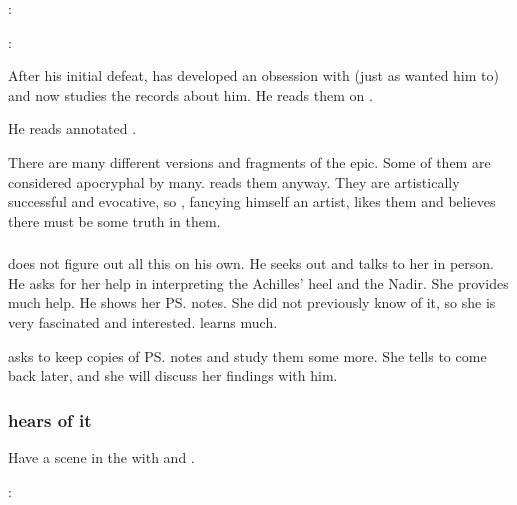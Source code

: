 \begin{garbage}
\begin{prose}
  \Menessiaraid:
  
  \Teshrial: 
\end{prose}

After his initial defeat, \Teshrial{} has developed an obsession with \Ishnaruchaefir{} (just as \Ishnaruchaefir{} wanted him to) and now studies the records about him. 
He reads them on . 

He reads \hs{\Urizeth} annotated \emph{\hs{\WanderersInDarkness}}. 

There are many different versions and fragments of the epic. 
Some of them are considered apocryphal by many. 
\Teshrial{} reads them anyway. 
They are artistically successful and evocative, so \Teshrial, fancying himself an artist, likes them and believes there must be some truth in them. 






\subsubsection{\Urizeth}
\Teshrial{} does not figure out all this on his own. 
He seeks out \Urizeth{} and talks to her in person. 
He asks for her help in interpreting the Achilles' heel and the Nadir. 
She provides much help. 
He shows her \ps{\Lothagiel} notes. 
She did not previously know of it, so she is very fascinated and interested. 
\Teshrial{} learns much. 

\Urizeth{} asks to keep copies of \ps{\Lothagiel} notes and study them some more. 
She tells \Teshrial{} to come back later, and she will discuss her findings with him. 






\subsubsection{\Ishnaruchaefir{} hears of it}
Have a scene in the  with \Criseis{} and \Ishnaruchaefir. 

\begin{prose}
  \Criseis:
  

\end{prose}
\end{garbage}
